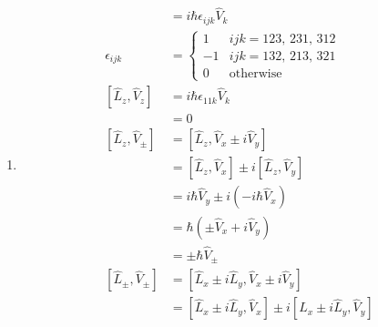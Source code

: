 \documentclass{article}
\begin{document}
\begin{enumerate}
  \item

        \begin{align*}
          [\hat{L}_i, \hat{V}_j]     & = i \hbar \epsilon_{i j k} \hat{V}_k                                                                        \\
          \epsilon_{i j k}           & = \begin{cases}
                                           1  & i j k = 123, \,231, \,312 \\
                                           -1 & i j k = 132, \,213, \,321 \\
                                           0  & \text{otherwise}
                                         \end{cases}                                                                            \\
          [\hat{L}_z, \hat{V}_z]     & = i \hbar \epsilon_{1 1 k} \hat{V}_k                                                                        \\
                                     & = 0                                                                                                         \\
          [\hat{L}_z, \hat{V}_\pm]   & = [\hat{L}_z, \hat{V}_x \pm i \hat{V}_y]                                                                    \\
                                     & = [\hat{L}_z, \hat{V}_x] \pm i [\hat{L}_z, \hat{V}_y]                                                       \\
                                     & = i \hbar \hat{V}_y \pm i (-i \hbar \hat{V}_x)                                                              \\
                                     & = \hbar (\pm \hat{V}_x + i \hat{V}_y)                                                                       \\
                                     & = \pm \hbar \hat{V}_\pm                                                                                     \\
          [\hat{L}_\pm, \hat{V}_\pm] & = [\hat{L}_x \pm i \hat{L}_y, \hat{V}_x \pm i \hat{V}_y]                                                    \\
                                     & = [\hat{L}_x \pm i \hat{L}_y, \hat{V}_x] \pm i [\hat{L}_x \pm i \hat{L}_y, \hat{V}_y]                       \\

\end{align*}
\end{enumerate}
\end{document}
